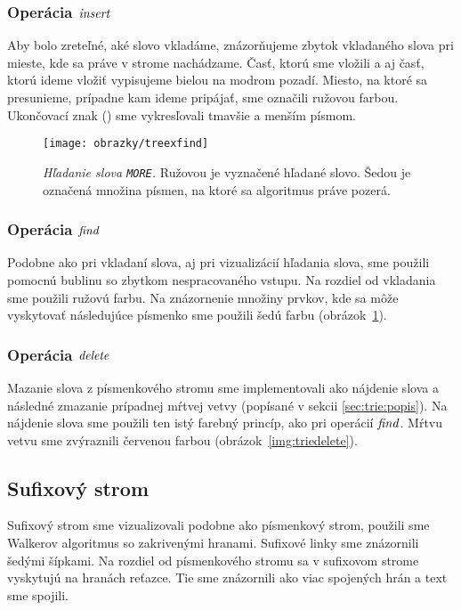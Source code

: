 \subsubsection{Operácia $\mathop{\mathit{insert}}$}

Aby bolo zreteľné, aké slovo vkladáme, znázorňujeme zbytok vkladaného slova 
pri mieste, kde sa práve v strome nachádzame. Časť, ktorú sme vložili a aj 
časť, ktorú ideme vložiť vypisujeme bielou na modrom pozadí. Miesto, na ktoré 
sa presunieme, prípadne kam ideme pripájať, sme označili ružovou farbou. 
Ukončovací znak (\uz) sme vykresľovali tmavšie a menším písmom.

\begin{figure}
\centering
\texttt{[image: obrazky/treexfind]}
\caption{\emph{Hľadanie slova {\tt MORE\uz}.} Ružovou je vyznačené hľadané 
slovo. Šedou je označená množina písmen, na ktoré sa algoritmus práve 
pozerá.}
\label{img:triefind}
\end{figure}

\subsubsection{Operácia $\mathop{\mathit{find}}$}

Podobne ako pri vkladaní slova, aj pri vizualizácií hľadania slova, sme 
použili pomocnú bublinu so zbytkom nespracovaného vstupu. Na rozdiel od 
vkladania sme použili ružovú farbu. Na znázornenie množiny prvkov, kde sa môže 
vyskytovať následujúce písmenko sme použili šedú farbu 
(obrázok~\ref{img:triefind}).

\subsubsection{Operácia $\mathop{\mathit{delete}}$}

Mazanie slova z písmenkového stromu sme implementovali ako nájdenie slova a 
následné zmazanie prípadnej mŕtvej vetvy (popísané v sekcii 
\ref{sec:trie:popis}). Na nájdenie slova sme použili ten istý farebný princíp, 
ako pri operácií $\mathop{\mathit{find}}$. Mŕtvu vetvu sme zvýraznili červenou farbou 
(obrázok~\ref{img:triedelete}).

\subsection{Sufixový strom}

Sufixový strom sme vizualizovali podobne ako písmenkový strom, použili sme 
Walkerov algoritmus \citep{walker} so zakrivenými hranami. Sufixové linky 
sme znázornili šedými šípkami. Na rozdiel od písmenkového stromu sa v 
sufixovom strome vyskytujú na hranách reťazce. Tie sme znázornili ako viac 
spojených hrán a text sme spojili.

